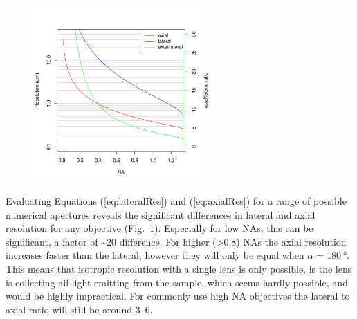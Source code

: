 
  \begin{figure}
    \centering
    \includegraphics[width=0.6\textwidth]{resolution}
    \label{fig:resolution}
  \end{figure}

  Evaluating Equations (\ref{eq:lateralRes}) and (\ref{eq:axialRes}) for a range of possible numerical apertures reveals the significant differences in lateral and axial resolution for any objective (Fig.~\ref{fig:resolution}). Especially for low NAs, this can be significant, a factor of \textasciitilde20 difference. For higher (>0.8) NAs the axial resolution increases faster than the lateral, however they will only be equal when $\alpha=\SI{180}{\degree}$. This means that isotropic resolution with a single lens is only possible, is the lens is collecting all light emitting from the sample, which seems hardly possible, and would be highly impractical. For commonly use high NA objectives the lateral to axial ratio will still be around 3--6. 

